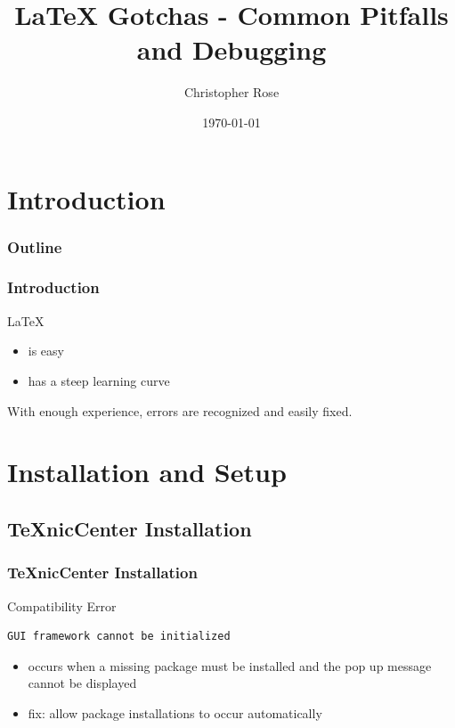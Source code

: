 \documentclass{beamer}
\title{\LaTeX{} Gotchas - Common Pitfalls and Debugging}
\author{Christopher Rose}
\institute{Electrical and Computer Engineering \\ Auburn University}
\date{\today}
\begin{document}
\maketitle

\section{Introduction}

\begin{frame}
\frametitle{Outline}
\tableofcontents[currentselection]
\end{frame}

\begin{frame}
\frametitle{Introduction}

\LaTeX
\begin{itemize}
\item is easy
\item has a steep learning curve
\end{itemize}
With enough experience, errors are recognized and easily fixed.

\end{frame}

\section{Installation and Setup}
\subsection{TeXnicCenter Installation}
\begin{frame}[fragile]
\frametitle{TeXnicCenter Installation}
\begin{block}{Compatibility Error}
\begin{verbatim}
GUI framework cannot be initialized
\end{verbatim}
\end{block}

\begin{itemize}
\item occurs when a missing package must be installed and the pop up message cannot be displayed
\item fix: allow package installations to occur automatically
\end{itemize}
\end{frame}
\end{document}
